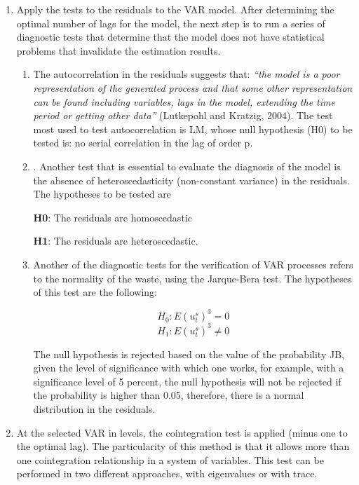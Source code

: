 \documentclass[12pt,english, spanish]{smfart}
\begin{document}
\begin{enumerate}
\item Apply the tests to the residuals to the VAR model. After determining the optimal number of lags for the model, the next step is to run a series of diagnostic tests that determine that the model does not have statistical problems that invalidate the estimation results.\par
\begin{enumerate}
\item The autocorrelation in the residuals suggests that: \textit{“the model is a poor representation of the generated process and that some other representation can be found including variables, lags in the model, extending the time period or getting other data”} (Lutkepohl and Kratzig, 2004). The test most used to test autocorrelation is LM, whose null hypothesis (H0) to be tested is: no serial correlation in the lag of order p.\par
\item. Another test that is essential to evaluate the diagnosis of the model is the absence of heteroscedasticity (non-constant variance) in the residuals. The hypotheses to be tested are\par 
\begin{center}
\textbf{H0}: The residuals are homoscedastic \par 
\textbf{H1}: The residuals are heteroscedastic.\par
\end{center}
\item Another of the diagnostic tests for the verification of VAR processes refers to the normality of the waste, using the Jarque-Bera test. The hypotheses of this test are the following:\par

\begin{equation}
 H_{0} : E(u_{t}^s)^3 = 0 
  \end{equation} 
  \begin{equation}
 H_{1} : E(u_{t}^s)^3 \neq 0
 \end{equation} 

The null hypothesis is rejected based on the value of the probability JB, given the level of significance with which one works, for example, with a significance level of 5 percent, the null hypothesis will not be rejected if the probability is higher than 0.05, therefore, there is a normal distribution in the residuals.\par
\end{enumerate}
\item At the selected VAR in levels, the cointegration test is applied (minus one to the optimal lag). The particularity of this method is that it allows more than one cointegration relationship in a system of variables. This test can be performed in two different approaches, with eigenvalues or with trace.\par
\end{enumerate}
\end{document}

